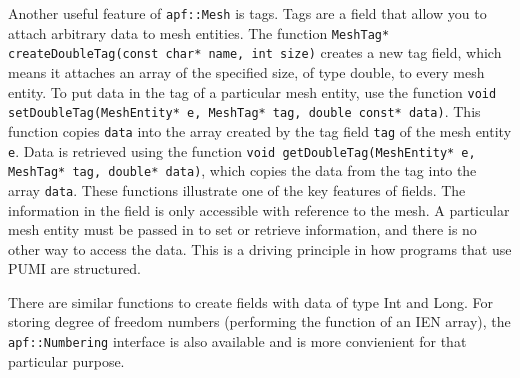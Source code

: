 \documentclass[12pt]{article}
\newcommand{\ttt}{\texttt}
\begin{document}
Another useful feature of \ttt{apf::Mesh} is tags.
Tags are a field that allow you to attach arbitrary data to mesh entities. The function
\newline
\newline
\noindent\ttt{MeshTag* createDoubleTag(const char* name, int size)}
\newline
\newline
creates a new tag field, which means it attaches an array of the specified size, of type double, to every mesh entity. 
To put data in the tag of a particular mesh entity, use the function
\newline
\newline
\noindent\ttt{void setDoubleTag(MeshEntity* e, MeshTag* tag, double const* data)}.
\newline
\newline
This function copies \ttt{data} into the array created by the tag field \ttt{tag} of the mesh entity \ttt{e}.  Data is retrieved using the function
\newline
\newline
\noindent\ttt{void getDoubleTag(MeshEntity* e, MeshTag* tag, double* data)},
\newline
\newline
which copies the data from the tag into the array \ttt{data}.
These functions illustrate one of the key features of fields.
The information in the field is only accessible with reference to the mesh.
A particular mesh entity must be passed in to set or retrieve information, and there is no other way to access the data.  
This is a driving principle in how programs that use PUMI are structured.

There are similar functions to create fields with data of type Int and Long.
For storing degree of freedom numbers (performing the function of an IEN array), the \ttt{apf::Numbering} interface is also available and is more convienient for that particular purpose.
\end{document}
